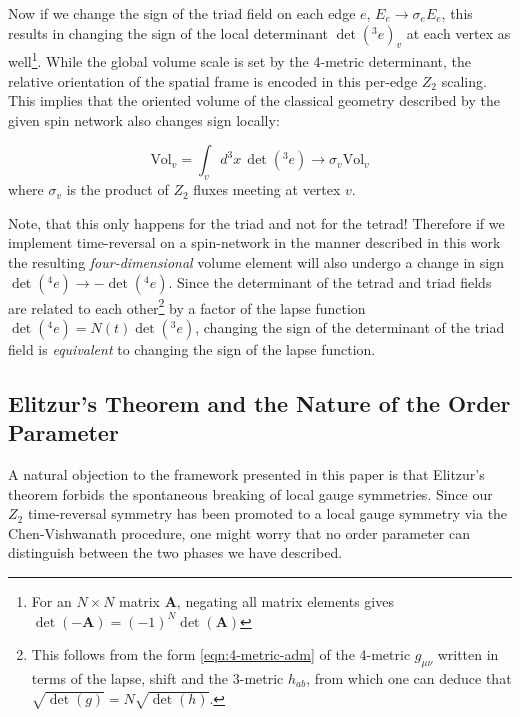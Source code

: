 \documentclass[preprint]{SciPost}
\newcommand{\mb}[1]{\mathbf{#1}}
\theoremstyle{plain} %
\begin{document}
Now if we change the sign of the triad field on each edge $e$, $E_e \rightarrow \sigma_e E_e$, this results in changing the sign of the local determinant $ \det({}^3 e)_v $ at each vertex as well\footnote{For an $ N \times N $ matrix $ \mb{A} $, negating all matrix elements gives $ \det(-\mb{A}) = (-1)^N \det(\mb{A}) $}. While the global volume scale is set by the 4-metric determinant, the relative orientation of the spatial frame is encoded in this per-edge $Z_2$ scaling. This implies that the oriented volume of the classical geometry described by the given spin network also changes sign locally:

\begin{equation}\label{eqn:volume-sign}
	\text{Vol}_v = \int_{v} d^3 x \, \det({}^3 e) \rightarrow \sigma_v \text{Vol}_v
\end{equation}
where $\sigma_v$ is the product of $Z_2$ fluxes meeting at vertex $v$.

Note, that this only happens for the triad and not for the tetrad! Therefore if we implement time-reversal on a spin-network in the manner described in this work the resulting \emph{four-dimensional} volume element will also undergo a change in sign $ \det({}^4 e) \rightarrow - \det({}^4 e) $. Since the determinant of the tetrad and triad fields are related to each other\footnote{This follows from the form \eqref{eqn:4-metric-adm} of the 4-metric $ g_{\mu\nu} $ written in terms of the lapse, shift and the 3-metric $ h_{ab} $, from which one can deduce that $ \sqrt{\det(g)} = N \sqrt{\det(h)} $.} by a factor of the lapse function $ \det({}^4 e) = N(t) \det({}^3 e) $, changing the sign of the determinant of the triad field is \emph{equivalent} to changing the sign of the lapse function.


\subsection{Elitzur's Theorem and the Nature of the Order Parameter}

A natural objection to the framework presented in this paper is that Elitzur's theorem \cite{Elitzur1975Impossibility} forbids the spontaneous breaking of local gauge symmetries. Since our $ Z_2 $ time-reversal symmetry has been promoted to a local gauge symmetry via the Chen-Vishwanath procedure, one might worry that no order parameter can distinguish between the two phases we have described.
\end{document}
